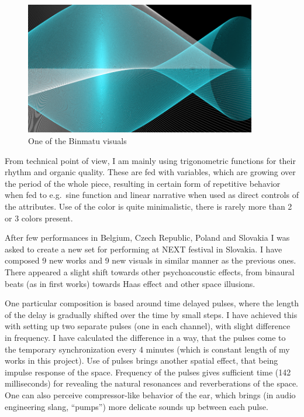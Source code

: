 \documentclass[12pt,a4paper,oneside]{report}
\begin{document}
\begin{figure}  
  \centering
    \includegraphics[width=0.9\textwidth]{img/binmatu}
	\caption{One of the Binmatu visuals}
	\label{fig:binmatu}
\end{figure}

From technical point of view, I am mainly using trigonometric functions for their rhythm and organic quality. These are fed with variables, which are growing over the period of the whole piece, resulting in certain form of repetitive behavior when fed to e.g.\ sine function and linear narrative when used as direct controls of the attributes. Use of the color is quite minimalistic, there is rarely more than 2 or 3 colors present.

After few performances in Belgium, Czech Republic, Poland and Slovakia I was asked to create a new set for performing at NEXT festival in Slovakia. I have composed 9 new works and 9 new visuals in similar manner as the previous ones. There appeared a slight shift towards other psychoacoustic effects, from binaural beats (as in first works) towards Haas effect and other space illusions.

One particular composition is based around time delayed pulses, where the length of the delay is gradually shifted over the time by small steps. I have achieved this with setting up two separate pulses (one in each channel), with slight difference in frequency. I have calculated the difference in a way, that the pulses come to the temporary synchronization every 4 minutes (which is constant length of my works in this project). Use of pulses brings another spatial effect, that being impulse response of the space. Frequency of the pulses gives sufficient time (142 milliseconds) for revealing the natural resonances and reverberations of the space. One can also perceive compressor-like behavior of the ear, which brings (in audio engineering slang, ``pumps'') more delicate sounds up between each pulse.
\end{document}
